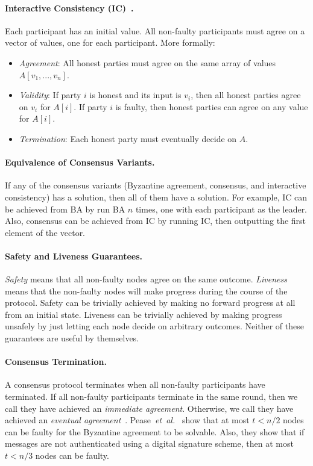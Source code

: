\documentclass[11pt]{article}
\newcommand{\etal}{\textit{et~al.}}
\theoremstyle{mytheoremstyle}
\begin{document}
\paragraph{Interactive Consistency (IC)~\cite{pease80reaching}.} Each participant has an initial value. All non-faulty participants must agree on a vector of values, one for each participant. More formally:
\begin{itemize}
\item \emph{Agreement}: All honest parties must agree on the same array of values $A[v_1,...,v_n]$. 
\item \emph{Validity}: If party $i$ is honest and its input is $v_i$, then all honest parties agree on $v_i$ for $A[i]$. If party $i$ is faulty, then honest parties can agree on any value for $A[i]$.
\item \emph{Termination}: Each honest party must eventually decide on $A$.
\end{itemize}

\paragraph{Equivalence of Consensus Variants.} If any of the consensus variants (Byzantine agreement, consensus, and interactive consistency) has a solution, then all of them have a solution. For example, IC can be achieved from BA by run BA $n$ times, one with each participant as the leader. Also, consensus can be achieved from IC by running IC, then outputting the first element of the vector.

\paragraph{Safety and Liveness Guarantees.} \emph{Safety} means that all non-faulty nodes agree on the same outcome. \emph{Liveness} means that the non-faulty nodes will make progress during the course of the protocol. Safety can be trivially achieved by making no forward progress at all from an initial state. Liveness can be trivially achieved by making progress unsafely by just letting each node decide on arbitrary outcomes. Neither of these guarantees are useful by themselves.

\paragraph{Consensus Termination.} A consensus protocol terminates when all non-faulty participants have terminated. If all non-faulty participants terminate in the same round, then we call they have achieved an \emph{immediate agreement}. Otherwise, we call they have achieved an \emph{eventual agreement}~\cite{fischer}.
Pease~\etal~\cite{pease80reaching} show that at most ${t<n/2}$ nodes can be faulty for the Byzantine agreement to be solvable. Also, they show that if messages are not authenticated using a digital signature scheme, then at most ${t<n/3}$ nodes can be faulty.
\end{document}
